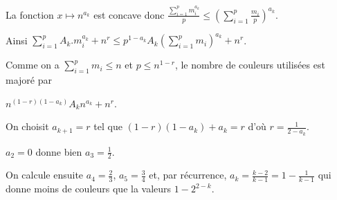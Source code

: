 \begin{Answer}
La fonction $x \mapsto n^{a_k}$ est concave donc $\displaystyle \frac {\sum_{i=1}^p m_i^{a_k}}p\le \left(\sum_{i=1}^p \frac {m_i}p\right)^{a_k}$.

Ainsi $\displaystyle \sum_{i=1}^p A_k.m_i^{a_k}+n^r\le p^{1-a_k} A_k \left(\sum_{i=1}^p  m_i\right)^{a_k} + n^r$.

Comme on a $\displaystyle \sum_{i=1}^p  m_i\le n$ et $p \le n^{1-r}$, le nombre de couleurs utilisées est majoré par

$\displaystyle n^{(1-r)(1-a_k)} A_k n^{a_k} + n^r$.

On choisit $a_{k+1}= r$ tel que $(1-r)(1-a_k)+a_k=r$ d'où $r = \frac 1{2-a_k}$.

$a_2=0$ donne bien $a_3 = \frac 12$.

On calcule ensuite $a_4 = \frac 23$, $a_5 = \frac 34$ et, par récurrence, $a_k = \frac{k-2}{k-1}=1 - \frac 1{k-1}$ qui donne moins de couleurs que la valeurs $1 -2^{2-k}$.
\end{Answer}
